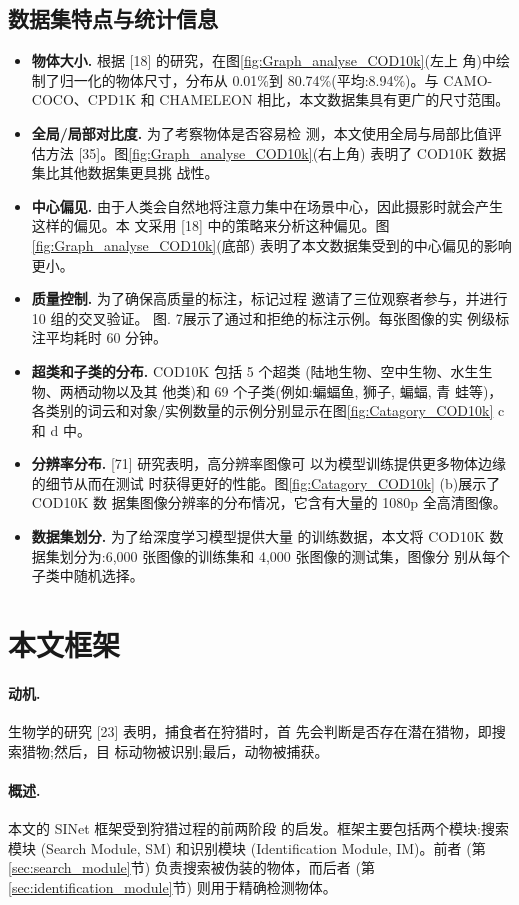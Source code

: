 \documentclass[final]{cvpr}
\newcommand{\mypara}[1]{\paragraph{#1.}}
\renewcommand{\figref}[1]{图\ref{#1}}
\renewcommand{\secref}[1]{第\ref{#1}节}
\begin{document}
\subsection{数据集特点与统计信息}
\begin{itemize}
    \item \textbf{物体大小. }根据 [18] 的研究，在\figref{fig:Graph_analyse_COD10k}(左上 角)中绘制了归一化的物体尺寸，分布从 0.01\%到 80.74\%(平均:8.94\%)。与 CAMO-COCO、CPD1K 和 CHAMELEON 相比，本文数据集具有更广的尺寸范围。
    \item \textbf{全局/局部对比度.} 为了考察物体是否容易检 测，本文使用全局与局部比值评估方法 [35]。\figref{fig:Graph_analyse_COD10k}(右上角) 表明了 COD10K 数据集比其他数据集更具挑 战性。
    \item \textbf{中心偏见.} 由于人类会自然地将注意力集中在场景中心，因此摄影时就会产生这样的偏见。本 文采用 [18] 中的策略来分析这种偏见。\figref{fig:Graph_analyse_COD10k}(底部) 表明了本文数据集受到的中心偏见的影响更小。
    \item \textbf{质量控制. }为了确保高质量的标注，标记过程 邀请了三位观察者参与，并进行 10 组的交叉验证。 图. 7展示了通过和拒绝的标注示例。每张图像的实 例级标注平均耗时 60 分钟。
    \item \textbf{超类和子类的分布. }COD10K 包括 5 个超类 (陆地生物、空中生物、水生生物、两栖动物以及其 他类)和 69 个子类(例如:蝙蝠鱼, 狮子, 蝙蝠, 青 蛙等)，各类别的词云和对象/实例数量的示例分别显示在\figref{fig:Catagory_COD10k} c 和 d 中。
    \item \textbf{分辨率分布. }[71] 研究表明，高分辨率图像可
以为模型训练提供更多物体边缘的细节从而在测试 时获得更好的性能。\figref{fig:Catagory_COD10k} (b)展示了 COD10K 数 据集图像分辨率的分布情况，它含有大量的 1080p 全高清图像。
    \item \textbf{数据集划分. }为了给深度学习模型提供大量 的训练数据，本文将 COD10K 数据集划分为:6,000 张图像的训练集和 4,000 张图像的测试集，图像分 别从每个子类中随机选择。
\end{itemize}

\section{本文框架}
\mypara{动机}生物学的研究 [23] 表明，捕食者在狩猎时，首 先会判断是否存在潜在猎物，即搜索猎物;然后，目 标动物被识别;最后，动物被捕获。
\mypara{概述}本文的 SINet 框架受到狩猎过程的前两阶段 的启发。框架主要包括两个模块:搜索模块 (Search Module, SM) 和识别模块 (Identification Module, IM)。前者 (\secref{sec:search_module}) 负责搜索被伪装的物体，而后者 (\secref{sec:identification_module}) 则用于精确检测物体。
\end{document}
